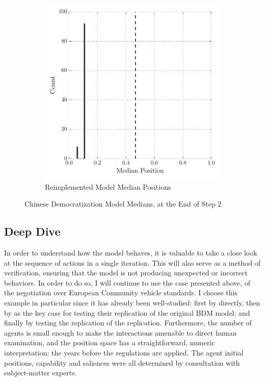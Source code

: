 \begin{figure}
\begin{subfigure}{0.49\textwidth}
        \includegraphics[width=\textwidth]{BDM_Reproduction/Figures/New_ChinaModel}
        \caption{Reimplemented Model Median Positions}
    \end{subfigure}

    \caption[Chinese Democratization Model Medians]{Chinese Democratization Model Medians, at the End of Step 2}
    \label{fig:china_medians}
    \figSpace
\end{figure}


\subsection{Deep Dive} \label{deep-dive}

In order to understand how the model behaves, it is valuable to take a close look at the sequence of actions in a single iteration. This will also serve as a method of verification, ensuring that the model is not producing unexpected or incorrect behaviors. In order to do so, I will continue to use the case presented above, of the negotiation over European Community vehicle standards. I choose this example in particular since it has already been well-studied: first by \citet{bdm_1994} directly, then by \citet{scholz_2011} as the key case for testing their replication of the original BDM model; and finally by \citet{mckibben_sanders_2014} testing the replication of the replication. Furthermore, the number of agents is small enough to make the interactions amenable to direct human examination, and the position space has a straightforward, numeric interpretation: the years before the regulations are applied. The agent initial positions, capability and saliences were all determined by consultation with subject-matter experts.

